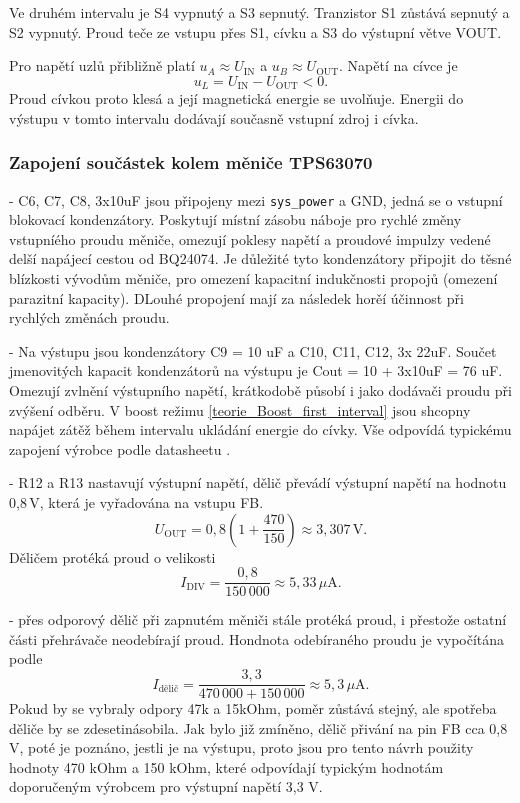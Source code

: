 Ve druhém intervalu je S4 vypnutý a S3 sepnutý.
Tranzistor S1 zůstává sepnutý a S2 vypnutý.
Proud teče ze vstupu přes S1, cívku a S3
do výstupní větve VOUT.

Pro napětí uzlů přibližně platí
$u_A\approx U_{\mathrm{IN}}$ a
$u_B\approx U_{\mathrm{OUT}}$. Napětí na cívce je
\[
    u_L=U_{\mathrm{IN}}-U_{\mathrm{OUT}}<0.
\]
Proud cívkou proto klesá a její magnetická energie
se uvolňuje. Energii do výstupu v tomto intervalu
dodávají současně vstupní zdroj i cívka.

\subsubsection{Zapojení součástek kolem měniče TPS63070}
- C6, C7, C8, 3x10uF jsou připojeny mezi \texttt{sys\_power} a GND, jedná se o vstupní blokovací kondenzátory. Poskytují místní zásobu náboje pro rychlé změny vstupníého proudu měniče, omezují poklesy napětí a proudové impulzy vedené delší napájecí cestou od BQ24074. Je důležité tyto kondenzátory připojit do těsné blízkosti vývodům měniče, pro omezení kapacitní indukčnosti propojů (omezení parazitní kapacity). DLouhé propojení mají za následek horěí účinnost při rychlých změnách proudu.

- Na výstupu jsou kondenzátory C9 = 10 uF a C10, C11, C12, 3x 22uF. Součet jmenovitých kapacit kondenzátorů na výstupu je Cout = 10 + 3x10uF = 76 uF. Omezují zvlnění výstupního napětí, krátkodobě působí i jako dodávači proudu při zvýšení odběru. V boost režimu \ref{teorie_Boost_first_interval} jsou shcopny napájet zátěž během intervalu ukládání energie do cívky. Vše odpovídá typickému zapojení výrobce podle datasheetu \cite{datasheet_tps63070}.

- R12 a R13 nastavují výstupní napětí, dělič převádí výstupní napětí na hodnotu 0,8\,V, která je vyřadována na vstupu FB. 
\[
U_{\mathrm{OUT}}
=0{,}8\left(1+\frac{470}{150}\right)
\approx3{,}307\,\mathrm{V}.
\]
Děličem protéká proud o velikosti \[
I_{\mathrm{DIV}}=\frac{0{,}8}{150\,000}
\approx5{,}33\,\mu\mathrm{A}.
\]

- přes odporový dělič při zapnutém měniči stále protéká proud, i přestože ostatní části přehrávače neodebírají proud. Hondnota odebíraného proudu je vypočítána podle \[
I_{\mathrm{dělič}}=\frac{3{,}3}{470\,000+150\,000}
\approx 5{,}3\,\mu\mathrm{A}.
\] Pokud by se vybraly odpory 47k a 15kOhm, poměr zůstává stejný, ale spotřeba děliče by se zdesetinásobila. Jak bylo již zmíněno, dělič přivání na pin FB cca 0,8 V, poté je poznáno, jestli je na výstupu, proto jsou pro tento návrh použity hodnoty 470 kOhm a 150 kOhm, které odpovídají typickým hodnotám doporučeným výrobcem pro výstupní napětí 3,3 V.

